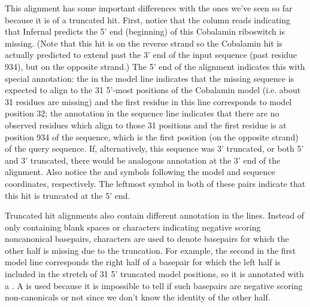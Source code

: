 This alignment has some important differences with the ones we've seen
so far because it is of a truncated hit. First, notice that the
 column reads  indicating that Infernal
predicts the 5' end (beginning) of this Cobalamin riboswitch is
missing. (Note that this hit is on the reverse strand so the Cobalamin
hit is actually predicted to extend past the 3' end of the input
sequence (past residue 934), but on the opposite strand.) The 5' end
of the alignment indicates this with special annotation: the
\otext{<[31]*} in the model line indicates that the missing sequence
is expected to align to the 31 5'-most positions of the Cobalamin
model (i.e. about 31 residues are missing) and the first 
residue in this line corresponds to model position 32; the
\otext{<[0]*} annotation in the sequence line indicates that there are
no observed residues which align to those 31 positions and the first
 residue is at position 934 of the sequence, which is the
first position (on the opposite strand) of the query sequence. If,
alternatively, this sequence was 3' truncated, or both 5' and 3'
truncated, there would be analogous annotation at the 3' end of the
alignment. Also notice the \otext{~]} and  symbols following
the model and sequence coordinates, respectively. The \otext{~}
leftmost symbol in both of these pairs indicate that this hit is
truncated at the 5' end. 

Truncated hit alignments also contain different annotation in the
 lines. Instead of only containing blank spaces or 
characters indicating negative scoring noncanonical basepairs,
 characters are used to denote basepairs for which the other
half is missing due to the truncation. For example, the second
 in the first model line corresponds the right half of a
basepair for which the left half is included in the stretch of 31 5'
truncated model positions, so it is annotated with a .  A
 is used because it is impossible to tell if such basepairs
are negative scoring non-canonicals or not since we don't know the
identity of the other half.

